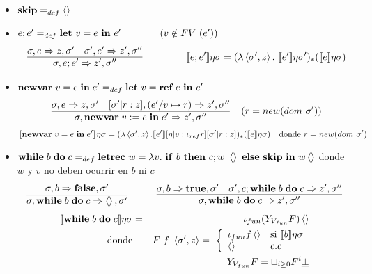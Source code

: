     \begin{itemize}
      \item $\textbf{skip} =_{def} \left\langle \right\rangle$
      \item $e;e' =_{def} \textbf{let}\ v=e \ \mathbf{in}\  e'\qquad\qquad(v\notin FV\ (e'))$
        \begin{eqnarray*}
          \begin{array}{c}
            \underline{\s,e \Rightarrow z,\s'\quad \s',e' \Rightarrow z',\s''}\\
            \s, e;e' \Rightarrow z',\s''
            \end{array} \qquad \qquad 
            \se{e;e'}\eta\s = (\lambda \la\s',z\ra.\ \se{e'}\eta\s')_*(\se{e}\eta\s)
        \end{eqnarray*}
      \item $\newvar{v=e}{e'} =_{def} \textbf{let}\ v=\textbf{ref}\ e \ine e'$
        \[\begin{array}{c}
        \underline{\sigma,e \Rightarrow z,\sigma'\quad [\sigma'|r:z],(e'/v\mapsto r) \Rightarrow z',\sigma''}\\
        \sigma,\textbf{newvar}\;v:=e\;\textbf{in}\;e' \Rightarrow z',\sigma''
        \end{array}
        \ \ (r=new(dom\ \sigma'))
        \]
        \[
        [\![\textbf{newvar}\;v=e\;\textbf{in}\;e']\!]\eta\sigma = (\lambda \left\langle \sigma', z\right\rangle.[\![e']\!][\eta|v:\iota_{ref}r][\sigma'|r:z])_{*}([\![e]\!]\eta\sigma)\quad\text{donde } r = new(dom\  \sigma') 
        \]
      \item $\while b\do c =_{def} \textbf{letrec}\ w=\lambda v.\ \ife b\thene c; w \ \la \ra \elsee \textbf{skip} \ine w \la \ra$
        \PN donde $w$ y $v$ no deben ocurrir en $b$ ni $c$
        \[\begin{array}{c}
          \s,b \Rightarrow \textbf{false},\s'\\
          \overline{\s, \while b\do c \Rightarrow \la\ra,\s'}
          \end{array}
          \qquad
          \begin{array}{c}
          \underline{\s,b \Rightarrow \textbf{true},\s'\quad \s', c;\while b \do c \Rightarrow z',\s''}\\
          \s, \while b \do c \Rightarrow z',\s''
          \end{array}
          \]
          \begin{eqnarray*}
            [\![\textbf{while}\;b\;\textbf{do}\;c]\!]\eta\sigma &=& \iota_{fun} (Y_{V_{fun}} F) \left\langle \right\rangle \\
            \text{donde} && F\ f \ \left\langle\sigma',z\right\rangle = 
            \ \left\lbrace 
            \begin{array}{lll}
              \iota_{fun} f \left\langle\right\rangle & \text{si } [\![b]\!]\eta\sigma \\
              \left\langle\right\rangle & c.c
            \end{array}\right. \\
            && Y_{V_{fun}} F = \sqcup_{i \geq 0} F^{i} \underline{\bot}
          \end{eqnarray*}
    \end{itemize}


